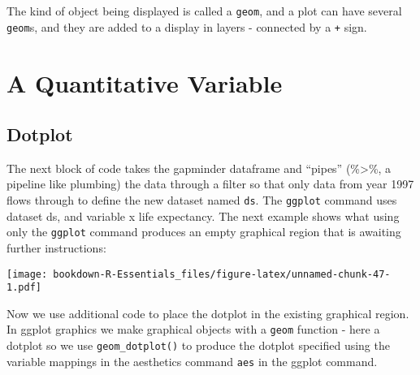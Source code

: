 \documentclass[
]{book}
\newenvironment{Shaded}{\begin{snugshade}}{\end{snugshade}}
\newcommand{\CommentTok}[1]{\textcolor[rgb]{0.56,0.35,0.01}{\textit{#1}}}
\newcommand{\DataTypeTok}[1]{\textcolor[rgb]{0.13,0.29,0.53}{#1}}
\newcommand{\DecValTok}[1]{\textcolor[rgb]{0.00,0.00,0.81}{#1}}
\newcommand{\KeywordTok}[1]{\textcolor[rgb]{0.13,0.29,0.53}{\textbf{#1}}}
\newcommand{\NormalTok}[1]{#1}
\newcommand{\OperatorTok}[1]{\textcolor[rgb]{0.81,0.36,0.00}{\textbf{#1}}}
\newcommand{\StringTok}[1]{\textcolor[rgb]{0.31,0.60,0.02}{#1}}
\begin{document}
The kind of object being displayed is called a \texttt{geom}, and a plot can have several \texttt{geom}s, and they are added to a display in layers - connected by a \texttt{+} sign.

\hypertarget{a-quantitative-variable}{%
\section{A Quantitative Variable}\label{a-quantitative-variable}}

\hypertarget{dotplot}{%
\subsection{Dotplot}\label{dotplot}}

The next block of code takes the gapminder dataframe and ``pipes'' (\%\textgreater\%, a pipeline like plumbing) the data through a filter so that only data from year 1997 flows through to define the new dataset named \texttt{ds}. The \texttt{ggplot} command uses dataset ds, and variable x life expectancy. The next example shows what using only the \texttt{ggplot} command produces an empty graphical region that is awaiting further instructions:

\begin{Shaded}
\end{Shaded}

\texttt{[image: bookdown-R-Essentials\_files/figure-latex/unnamed-chunk-47-1.pdf]}

Now we use additional code to place the dotplot in the existing graphical region. In ggplot graphics we make graphical objects with a \texttt{geom} function - here a dotplot so we use \texttt{geom\_dotplot()} to produce the dotplot specified using the variable mappings in the aesthetics command \texttt{aes} in the ggplot command.

\begin{Shaded}
\end{Shaded}
\end{document}
